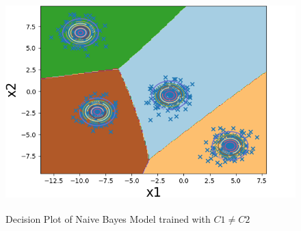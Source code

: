 \begin{figure}[!ht]
    \centering
    \includegraphics[height=3.3in]{Dataset_1a/Naive_Bayes_Classifier_case3_decision_plot.png}
    \caption{Decision Plot of Naive Bayes Model trained with $C1 \neq C2$ }
    \label{fig:12}
\end{figure}



